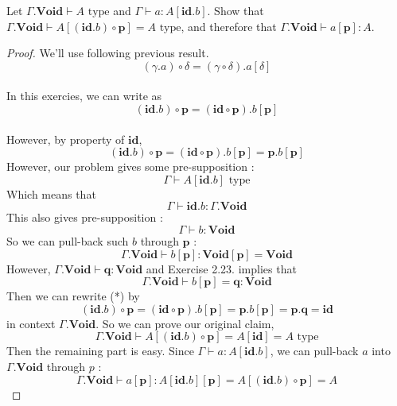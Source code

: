 \documentclass[12pt, a4paper, openany, twoside]{book}
\theoremstyle{definition}
\theoremstyle{remark}
\theoremstyle{plain}
\numberwithin{equation}{section}
\begin{document}
\begin{tcolorbox}[breakable, colback=yellow!10!white,colframe=brown!75!black,title=Exercise 3.2.7.]\hypertarget{const 3.2.7.}{}
Let $\Gamma.\mathbf{Void} \vdash A \text{ type}$ and $\Gamma \vdash a : A[\mathbf{id}.b]$. Show that 
$\Gamma.\mathbf{Void} \vdash A[(\mathbf{id}.b) \circ \mathbf{p}] = A \text{ type}$, and therefore that $\Gamma.\mathbf{Void} \vdash a[\mathbf{p}] : A$. 

\begin{proof}
    
We'll use following previous result. 
\[(\gamma.a) \circ \delta = (\gamma \circ \delta).a[\delta]\]
\\
In this exercies, we can write as 
\[(\mathbf{id}.b) \circ \mathbf{p} = (\mathbf{id} \circ \mathbf{p}).b[\mathbf{p}]\]
\\
However, by property of $\mathbf{id}$, 
\[(\mathbf{id}.b) \circ \mathbf{p} = (\mathbf{id} \circ \mathbf{p}).b[\mathbf{p}] = \mathbf{p}.b[\mathbf{p}]\tag{*}\]
However, our problem gives some pre-supposition : 
\[\Gamma \vdash A[\mathbf{id}.b] \text{ type}\]
Which means that 
\[\Gamma \vdash \mathbf{id}.b : \Gamma.\mathbf{Void}\]
This also gives pre-supposition : 
\[\Gamma \vdash b : \mathbf{Void}\]
So we can pull-back such $b$ through $\mathbf{p}$ : 
\[\Gamma.\mathbf{Void} \vdash b[\mathbf{p}] : \mathbf{Void}[\mathbf{p}] = \mathbf{Void}\]
However, $\Gamma.\mathbf{Void} \vdash \mathbf{q} : \mathbf{Void}$ and Exercise 2.23. implies that 
\[\Gamma.\mathbf{Void} \vdash b[\mathbf{p}] = \mathbf{q} : \mathbf{Void}\]
Then we can rewrite (*) by 
\[\]\[(\mathbf{id}.b) \circ \mathbf{p} = (\mathbf{id} \circ \mathbf{p}).b[\mathbf{p}] = \mathbf{p}.b[\mathbf{p}] = \mathbf{p}.\mathbf{q} = \mathbf{id}\]
in context $\Gamma.\mathbf{Void}$. So we can prove our original claim, 
\[\Gamma.\mathbf{Void} \vdash A[(\mathbf{id}.b) \circ \mathbf{p}] = A[\mathbf{id}] = A \text{ type}\]
Then the remaining part is easy. Since $\Gamma \vdash a : A[\mathbf{id}.b]$, we can pull-back $a$ into $\Gamma.\mathbf{Void}$ through $p$ : 
\[\Gamma.\mathbf{Void} \vdash a[\mathbf{p}] : A[\mathbf{id}.b][\mathbf{p}] = A[(\mathbf{id}.b)\circ \mathbf{p}] = A\]
\end{proof}
\end{tcolorbox}
\end{document}
